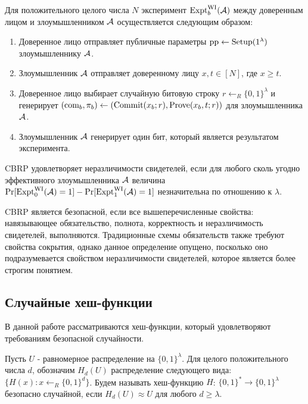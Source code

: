 \begin{definition}[$\ExptWI$]
	Для положительного целого числа $N$ эксперимент $\text{Expt}^\text{WI}_b(\mathcal{A})$ между доверенным лицом и злоумышленником $\mathcal{A}$ осуществляется следующим образом:
	\begin{enumerate}
		\item Доверенное лицо отправляет публичные параметры $\text{pp} \leftarrow \text{Setup}(1^\lambda)$ злоумышленнику $\mathcal{A}$.
		\item Злоумышленник $\mathcal{A}$ отправляет доверенному лицу $x, t \in [N]$, где $x \geq t$.
		\item Доверенное лицо выбирает случайную битовую строку $r \leftarrow_R \{0, 1\}^\lambda$ и генерирует $(\text{com}_b, \pi_b) \leftarrow (\text{Commit}(x_b; r), \text{Prove}(x_b, t; r))$ для злоумышленника $\mathcal{A}$.
		\item Злоумышленник $\mathcal{A}$ генерирует один бит, который является результатом эксперимента.
	\end{enumerate}
\end{definition}

\begin{definition}
	CBRP удовлетворяет неразличимости свидетелей, если для любого сколь угодно эффективного злоумышленника $\mathcal{A}$ величина $\Pr[\text{Expt}^\text{WI}_0(\mathcal{A}) = 1] - \Pr[\text{Expt}^\text{WI}_1(\mathcal{A})=1]$ незначительна по отношению к $\lambda$.
\end{definition}

CBRP является безопасной, если все вышеперечисленные свойства: навязывающее обязательство, полнота, корректность и неразличимость свидетелей, выполняются.
Традиционные схемы обязательств также требуют свойства сокрытия, однако данное определение опущено, посколько оно подразумевается свойством неразличимости свидетелей, которое является более строгим понятием.

\subsection{Случайные хеш-функции} %
В данной работе рассматриваются хеш-функции, который удовлетворяют требованиям безопасной случайности.

\begin{definition}
	Пусть $U$ - равномерное распределение на $\{0, 1\}^\lambda$.
	Для целого положительного числа $d$, обозначим $H_d(U)$ распределение следующего вида: $\{H(x): x \leftarrow_R \{0, 1\}^d\}$.
	Будем называть хеш-функцию $H$: $\{0, 1\}^* \rightarrow \{0, 1\}^\lambda$ безопасно случайной, если $H_d(U) \approx U$ для любого $d \geq \lambda$.
\end{definition}

